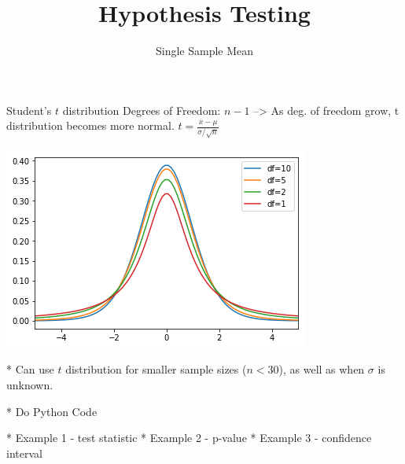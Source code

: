 \documentclass[t]{beamer}
\title{Hypothesis Testing}
\subtitle{Single Sample Mean}
\author{}
\date{}
\begin{document}

\begin{frame} 
\maketitle
\end{frame}

\begin{frame}
Student's $t$ distribution
Degrees of Freedom: $n-1$ --> As deg. of freedom grow, t distribution becomes more normal.
$t = \frac{\overline{x}-\mu}{\sigma/\sqrt{n}}$
\begin{center}
\includegraphics[scale=0.8]{../Images/t_distribution_df.png}
\end{center}
\end{frame}

* Can use $t$ distribution for smaller sample sizes ($n < 30$), as well as when $\sigma$ is unknown. 

* Do Python Code

* Example 1 - test statistic
* Example 2 - p-value
* Example 3 - confidence interval
\end{document}

